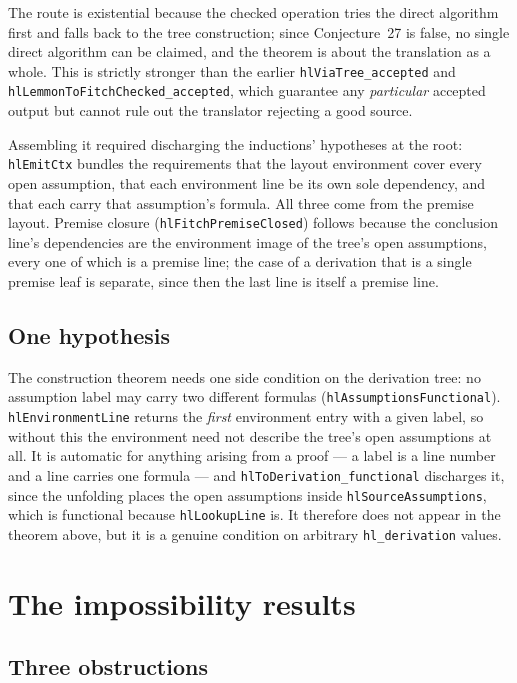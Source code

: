 \documentclass[11pt]{article}
\theoremstyle{plain}
\newcommand{\ubrk}{\_\discretionary{}{}{}}
\newcommand{\isa}[1]{\textup{\texttt{\small #1}}}
\begin{document}
\noindent
The route is existential because the checked operation tries the direct
algorithm first and falls back to the tree construction; since Conjecture~27 is
false, no single direct algorithm can be claimed, and the theorem is about the
translation as a whole. This is strictly stronger than the earlier
\isa{hlViaTree\ubrk{}accepted} and \isa{hlLemmonToFitchChecked\ubrk{}accepted}, which
guarantee any \emph{particular} accepted output but cannot rule out the
translator rejecting a good source.

Assembling it required discharging the inductions' hypotheses at the root:
\isa{hlEmitCtx} bundles the requirements that the layout environment cover every
open assumption, that each environment line be its own sole dependency, and that
each carry that assumption's formula. All three come from the premise layout.
Premise closure (\isa{hlFitchPremiseClosed}) follows because the conclusion
line's dependencies are the environment image of the tree's open assumptions,
every one of which is a premise line; the case of a derivation that is a single
premise leaf is separate, since then the last line is itself a premise line.

\subsection{One hypothesis}

The construction theorem needs one side condition on the derivation tree: no
assumption label may carry two different formulas
(\isa{hlAssumptionsFunctional}). \isa{hlEnvironmentLine} returns the
\emph{first} environment entry with a given label, so without this the
environment need not describe the tree's open assumptions at all. It is
automatic for anything arising from a proof --- a label is a line number and a
line carries one formula --- and \isa{hlToDerivation\ubrk{}functional} discharges it,
since the unfolding places the open assumptions inside
\isa{hlSourceAssumptions}, which is functional because \isa{hlLookupLine} is. It
therefore does not appear in the theorem above, but it is a genuine condition on
arbitrary \isa{hl\ubrk{}derivation} values.

\section{The impossibility results}\label{sec:impossibility}

\subsection{Three obstructions}
\end{document}
